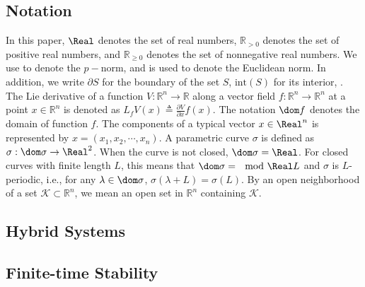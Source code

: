 \subsection{Notation}
In this paper, $\Real$ denotes the set of real numbers, $\mathbb R_{>0}$ denotes the set of positive real numbers, and $\mathbb R_{\geq0}$ denotes the set of nonnegative real numbers. We use  to denote the $p-$norm, and \ak{$\norm{\cdot}$} is used to denote the Euclidean norm. In addition, we write $\partial S$ for the boundary of the set $S$, $\textrm{int}(S)$ for its interior, . The Lie derivative of a function $V:\mathbb R^n\rightarrow \mathbb R$ along a vector field $f:\mathbb R^n\rightarrow\mathbb R^n$ at a point $x\in \mathbb R^n$ is denoted as $L_fV(x) \triangleq \frac{\partial V}{\partial x} f(x)$. The notation $\dom f$ denotes the domain of  function $f$. The components of a typical vector $x\in \Real^n$ is represented by $x = (x_1, x_2, \cdots,x_n)$. A parametric curve $\sigma$ is defined as $\sigma: \dom \sigma \to \Real^2$. When the curve is not closed, $\dom \sigma = \Real$. 
For closed curves with finite length $L$, this means that
 $\dom \sigma = \mod{\Real}{L}$ and $\sigma$ is $L$-periodic, i.e., for any $\lambda \in \dom \sigma$, $\sigma(\lambda + L) = \sigma(L)$. By an open neighborhood of a set $\mathcal{K} \subset \mathbb{R}^{n}$, we mean an open set in $\mathbb{R}^{n}$ containing $\mathcal{K}$.
\subsection{Hybrid Systems}

\subsection{Finite-time Stability}
